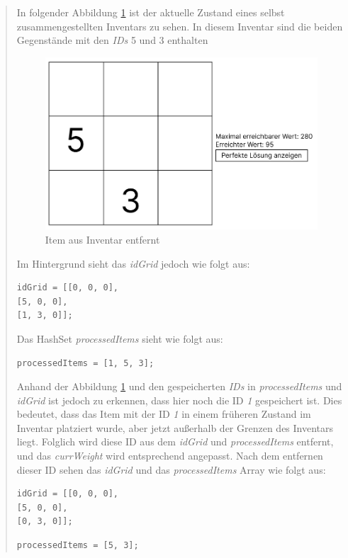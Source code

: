 \begin{quote}
In folgender Abbildung \ref{fig:controller_itemEntfernt} ist der aktuelle Zustand eines selbst zusammengestellten Inventars
zu sehen. In diesem Inventar sind die beiden Gegenstände mit den \textit{IDs} 5 und 3 enthalten

\begin{figure}[H]
\centering
\includegraphics[scale=0.6]{images/itemEntfernt}
\caption{Item aus Inventar entfernt}
\label{fig:controller_itemEntfernt}
\end{figure}
Im Hintergrund sieht das \textit{idGrid} jedoch wie folgt aus:

\begin{lstlisting}[style=csharp label=code:controller_savedIDitemEntferntGrid]
idGrid = [[0, 0, 0],
[5, 0, 0],
[1, 3, 0]];
\end{lstlisting}

Das HashSet \textit{processedItems} sieht wie folgt aus:

\begin{lstlisting}[style=csharp label=code:controller_savedIDItemEntferntHash]
processedItems = [1, 5, 3];
\end{lstlisting}

Anhand der Abbildung \ref{fig:controller_itemEntfernt} und den gespeicherten \textit{IDs} in \textit{processedItems} und
\textit{idGrid} ist jedoch zu erkennen, dass hier noch die ID \textit{1} gespeichert ist. Dies bedeutet, dass das Item
mit der ID \textit{1} in einem früheren Zustand im Inventar platziert wurde, aber jetzt außerhalb der Grenzen des Inventars
liegt. Folglich wird diese ID aus dem \textit{idGrid} und \textit{processedItems} entfernt, und das \textit{currWeight}
wird entsprechend angepasst. Nach dem entfernen dieser ID sehen das \textit{idGrid} und das \textit{processedItems} Array
wie folgt aus:

\begin{lstlisting}[style=csharp label=code:controller_savedIDgg]
idGrid = [[0, 0, 0],
[5, 0, 0],
[0, 3, 0]];
\end{lstlisting}
\begin{lstlisting}[style=csharp label=code:controller_savedIDID]
processedItems = [5, 3];
\end{lstlisting}
\end{quote}

